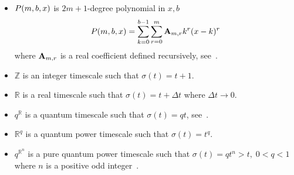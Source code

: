 \begin{itemize}
    \item $P ( m, b, x )$ is $2m+1$-degree polynomial in $x,b$
    \begin{equation}
        P ( m, b, x ) = \sum_{k=0}^{b-1} \sum_{r=0}^{m} {\mathbf{A}} \sb{m,r} k^r(x-k)^r
        \label{eq:polynomial_p}
    \end{equation}
    where ${\mathbf{A}} \sb{m,r}$ is a real coefficient defined recursively, see~\cite{kolosov2016link}.

    \item $\mathbb{Z}$ is an integer timescale such that $\sigma(t) = t+1$.

    \item $\mathbb{R}$ is a real timescale such that $\sigma(t) = t+\Delta t$ where $\Delta t \to 0$.

    \item $q^\mathbb{R}$ is a quantum timescale such that $\sigma(t) = qt$,
    see~\cite[p. 18]{Bohner2001DynamicEO}.

    \item $\mathbb{R}^q$ is a quantum power timescale such that $\sigma(t) = t^q$.

    \item $q^{\mathbb{R}^n}$ is a pure quantum power timescale
    such that $\sigma(t) = qt^n > t, \; 0<q<1$ where $n$ is a positive
    odd integer~\cite{aldwoah2011power}.
\end{itemize}
